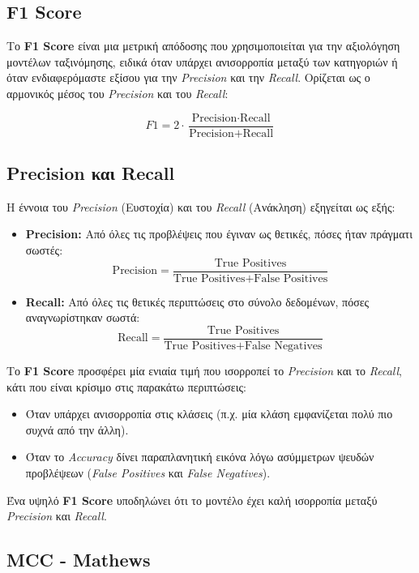 \documentclass[diploma]{softlab-thesis}
\begin{document}
\subsection{F1 Score}

Το \textbf{F1 Score} είναι μια μετρική απόδοσης που χρησιμοποιείται για την αξιολόγηση μοντέλων ταξινόμησης, ειδικά όταν υπάρχει ανισορροπία μεταξύ των κατηγοριών ή όταν ενδιαφερόμαστε εξίσου για την \textit{Precision} και την \textit{Recall}. Ορίζεται ως ο αρμονικός μέσος του \textit{Precision} και του \textit{Recall}:

\[
F1 = 2 \cdot \frac{\text{Precision} \cdot \text{Recall}}{\text{Precision} + \text{Recall}}
\]

\subsection*{Precision και Recall}
Η έννοια του \textit{Precision} (Ευστοχία) και του \textit{Recall} (Ανάκληση) εξηγείται ως εξής:
\begin{itemize}
    \item \textbf{Precision:} Από όλες τις προβλέψεις που έγιναν ως θετικές, πόσες ήταν πράγματι σωστές:
    \[
    \text{Precision} = \frac{\text{True Positives}}{\text{True Positives} + \text{False Positives}}
    \]
    \item \textbf{Recall:} Από όλες τις θετικές περιπτώσεις στο σύνολο δεδομένων, πόσες αναγνωρίστηκαν σωστά:
    \[
    \text{Recall} = \frac{\text{True Positives}}{\text{True Positives} + \text{False Negatives}}
    \]
\end{itemize}


Το \textbf{F1 Score} προσφέρει μία ενιαία τιμή που ισορροπεί το \textit{Precision} και το \textit{Recall}, κάτι που είναι κρίσιμο στις παρακάτω περιπτώσεις:
\begin{itemize}
    \item Όταν υπάρχει ανισορροπία στις κλάσεις (π.χ. μία κλάση εμφανίζεται πολύ πιο συχνά από την άλλη).
    \item Όταν το \textit{Accuracy} δίνει παραπλανητική εικόνα λόγω ασύμμετρων ψευδών προβλέψεων (\textit{False Positives} και \textit{False Negatives}).
\end{itemize}

Ένα υψηλό \textbf{F1 Score} υποδηλώνει ότι το μοντέλο έχει καλή ισορροπία μεταξύ \textit{Precision} και \textit{Recall}.

\subsection{MCC - Mathews}
\end{document}
